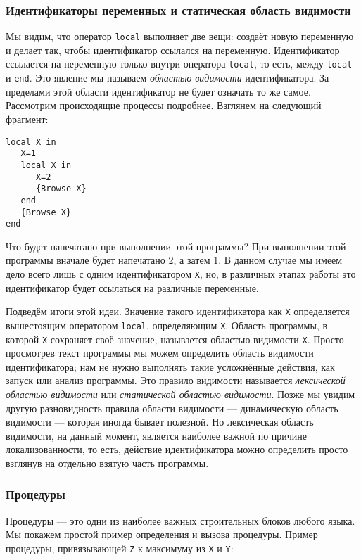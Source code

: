 \subsubsection{Идентификаторы переменных и статическая область видимости}

Мы видим, что оператор \lstinline|local| выполняет две вещи: создаёт новую переменную и делает так, чтобы идентификатор ссылался на переменную. Идентификатор ссылается на переменную только внутри оператора \lstinline|local|, то есть, между \lstinline|local| и \lstinline|end|. Это явление мы называем \emph{областью видимости} идентификатора. За пределами этой области идентификатор не будет означать то же самое. Рассмотрим происходящие процессы подробнее. Взглянем на следующий фрагмент:

\begin{lstlisting}
local X in
   X=1
   local X in
      X=2
      {Browse X}
   end
   {Browse X}
end
\end{lstlisting}

Что будет напечатано при выполнении этой программы? При выполнении этой программы вначале будет напечатано 2, а затем 1. В данном случае мы имеем дело всего лишь с одним идентификатором \lstinline|X|, но, в различных этапах работы это идентификатор будет ссылаться на различные переменные.

Подведём итоги этой идеи. Значение такого идентификатора как \lstinline|X| определяется вышестоящим оператором \lstinline|local|, определяющим \lstinline|X|. Область программы, в которой \lstinline|X| сохраняет своё значение, называется областью видимости \lstinline|X|. Просто просмотрев текст программы мы можем определить область видимости идентификатора; нам не нужно выполнять такие усложнённые действия, как запуск или анализ программы. Это правило видимости называется \emph{лексической областью видимости} или \emph{статической областью видимости}. Позже мы увидим другую разновидность правила области видимости --- динамическую область видимости --- которая иногда бывает полезной. Но лексическая область видимости, на данный момент, является наиболее важной по причине локализованности, то есть, действие идентификатора можно определить просто взглянув на отдельно взятую часть программы.

\subsubsection{Процедуры}

Процедуры --- это одни из наиболее важных строительных блоков любого языка. Мы покажем простой пример определения и вызова процедуры. Пример процедуры, привязывающей \lstinline|Z| к максимуму из \lstinline|X| и \lstinline|Y|:

